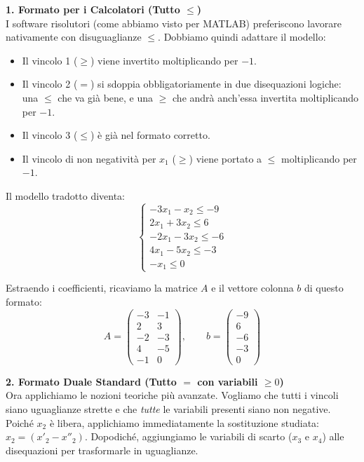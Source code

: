 \documentclass[12pt, a4paper]{article}
\begin{document}
	\vspace{0.4cm}
	\textbf{1. Formato per i Calcolatori (Tutto $\leq$)}\\
	I software risolutori (come abbiamo visto per MATLAB) preferiscono lavorare nativamente con disuguaglianze $\leq$. Dobbiamo quindi adattare il modello:
	\begin{itemize}[label=\textcolor{titlecolor}{\Large\textbullet}, itemsep=2pt, leftmargin=1.5cm]
		\item Il vincolo 1 ($\geq$) viene invertito moltiplicando per $-1$.
		\item Il vincolo 2 ($=$) si sdoppia obbligatoriamente in due disequazioni logiche: una $\leq$ che va già bene, e una $\geq$ che andrà anch'essa invertita moltiplicando per $-1$.
		\item Il vincolo 3 ($\leq$) è già nel formato corretto.
		\item Il vincolo di non negatività per $x_1$ ($\geq$) viene portato a $\leq$ moltiplicando per $-1$.
	\end{itemize}
	
	Il modello tradotto diventa:
	\[
	\begin{cases}
		-3x_1 - x_2 \leq -9 \\
		2x_1 + 3x_2 \leq 6 \\
		-2x_1 - 3x_2 \leq -6 \\
		4x_1 - 5x_2 \leq -3 \\
		-x_1 \leq 0
	\end{cases}
	\]
	
	Estraendo i coefficienti, ricaviamo la matrice $A$ e il vettore colonna $b$ di questo formato:
	\[
	A = \begin{pmatrix} 
		-3 & -1 \\ 
		2 & 3 \\ 
		-2 & -3 \\ 
		4 & -5 \\ 
		-1 & 0 
	\end{pmatrix}, \qquad 
	b = \begin{pmatrix} 
		-9 \\ 
		6 \\ 
		-6 \\ 
		-3 \\ 
		0 
	\end{pmatrix}
	\]
	
	\vspace{0.6cm}
	\textbf{2. Formato Duale Standard (Tutto $=$ con variabili $\geq 0$)}\\
	Ora applichiamo le nozioni teoriche più avanzate. Vogliamo che tutti i vincoli siano uguaglianze strette e che \textit{tutte} le variabili presenti siano non negative. 
	Poiché $x_2$ è libera, applichiamo immediatamente la sostituzione studiata: $x_2 = (x'_2 - x''_2)$.
	Dopodiché, aggiungiamo le variabili di scarto ($x_3$ e $x_4$) alle disequazioni per trasformarle in uguaglianze. 
	
\end{document}
